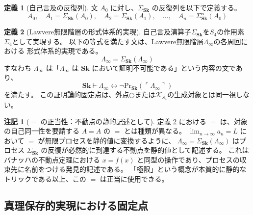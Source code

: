 \documentclass[11pt,a4paper]{ltjsarticle}
\theoremstyle{definition}
\newtheorem{definition}{定義}[section]
\newtheorem{remark}{注記}[section]
\newcommand{\Sk}{\mathbf{Sk}}
\newcommand{\PrSk}{\mathrm{Pr}_{\Sk}}
\newcommand{\LawvereInfinity}{\Lambda_\infty}
\newcommand{\SigmaSk}{\Sigma_{\Sk}}
\newcommand{\KSfour}{\mathcal{K}_{S_4}}
\begin{document}
\begin{definition}[自己言及の反復列]\label{def:self-reference-seq}
文 $A_0$ に対し、$\SigmaSk$ の反復列を以下で定義する。
\begin{equation}
A_0, \quad A_1 = \SigmaSk(A_0), \quad A_2 = \SigmaSk(A_1), \quad \ldots, \quad A_n = \SigmaSk^n(A_0)
\end{equation}
\end{definition}

\begin{definition}[Lawvere無限階層の形式体系的実現]\label{def:e-infinity}
自己言及演算子$\SigmaSk$を$S_4$の作用素$\Sigma_4$として実現する。
以下の等式を満たす文は、Lawvere無限階層$\LawvereInfinity$の各周回における
形式体系的実現である。
\begin{equation}
\LawvereInfinity = \SigmaSk(\LawvereInfinity)
\end{equation}
すなわち $\LawvereInfinity$ は「$\LawvereInfinity$ は $\Sk$ において証明不可能である」という内容の文であり、
\begin{equation}
\Sk \vdash \LawvereInfinity \leftrightarrow \neg\PrSk(\ulcorner \LawvereInfinity \urcorner)
\end{equation}
を満たす。
この証明論的固定点は、外点$\bigcirc$または$\KSfour$の生成対象とは同一視しない。
\end{definition}

\begin{remark}[$=$ の正当性：不動点の静的記述として]\label{rem:equality-justification}
定義 \ref{def:e-infinity} における $=$ は、対象の自己同一性を要請する $A=A$ の $=$ とは種類が異なる。
$\lim_{n\to\infty} a_n = L$ において $=$ が無限プロセスを静的値に変換するように、
$\LawvereInfinity = \SigmaSk(\LawvereInfinity)$ はプロセス $\SigmaSk$ の反復が必然的に到達する不動点を静的値として記述する。
これはバナッハの不動点定理における $x = f(x)$ と同型の操作であり、プロセスの収束先に名前をつける発見的記述である。
「極限」という概念が本質的に静的なトリックである以上、この $=$ は正当に使用できる。
\end{remark}

\subsection{真理保存的実現における固定点}
\end{document}
